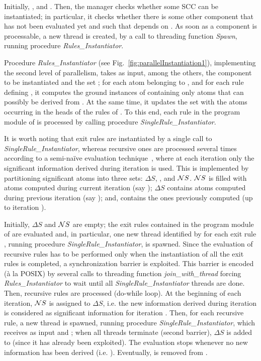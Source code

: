 \documentclass[preprint]{tlp}
\newcommand{\DNF}{\ensuremath{\Delta S}\xspace}
\newcommand{\NNF}{\ensuremath{{\cal N}S}\xspace}
\begin{document}
Initially, , and . Then,
the manager checks whether some SCC  can be instantiated; in particular,
it checks whether there is some other component  that has not been evaluated yet and such that  depends on .
As soon as a component  is processable,  a new thread is created, by a call to threading function {\em Spawn}, running procedure
{\em Rules\_Instantiator}.

Procedure {\em Rules\_Instantiator} (see Fig.~\ref{fig:parallelInstantiation1}), implementing the second level of parallelism,
takes as input, among the others, the component  to be instantiated and the set ;
for each atom  belonging to , and for each rule  defining
, it computes the ground instances of  containing only atoms
that can possibly be derived from . At the same time, it
updates the set  with the atoms occurring in the heads of the
rules of . To this end, each rule  in the program module of
 is processed by calling procedure {\em
SingleRule\_Instantiator}.

It is worth noting that exit rules are instantiated by a single
call to {\em SingleRule\_Instantiator}, whereas recursive ones are
processed several times according to a semi-na\"ive evaluation
technique~\cite{ullm-89}, where at each iteration  only the
significant information derived  during iteration  is
used. This is implemented by partitioning significant atoms into
three sets: \DNF, , and \NNF. \NNF is filled with atoms computed
during current iteration (say ); \DNF contains atoms computed
during previous iteration (say ); and,  contains the ones
previously computed (up to iteration ).

 Initially, \DNF and \NNF are empty; the exit rules contained in the program module
of  are evaluated  and, in particular, one new thread identified by  for each
exit rule , running procedure {\em SingleRule\_Instantiator}, is
spawned. Since the evaluation of recursive rules has to be performed only
when the instantiation of all the exit rules is completed, a synchronization barrier is
exploited. This barrier is encoded (\`{a} la POSIX) by several calls to threading function {\em join\_with\_thread}
forcing {\em Rules\_Instantiator} to wait until all {\em SingleRule\_Instantiator} threads are done.
Then, recursive rules are
processed (do-while loop). At the beginning of each iteration, \NNF
is assigned to \DNF, i.e. the new information derived during
iteration  is considered as significant information for iteration
. Then, for each recursive rule, a new thread is spawned,
running procedure {\em SingleRule\_Instantiator}, which receives as
input  and ; when all threads terminate (second barrier), \DNF is added to
 (since it has already been exploited). The evaluation stops
whenever no new information has been derived (i.e. ). Eventually,  is removed from .
\end{document}
